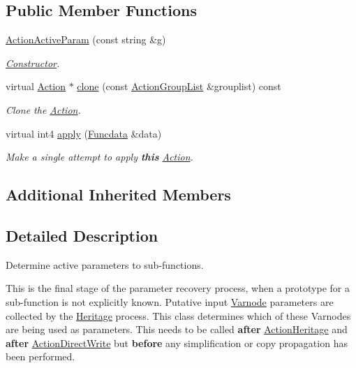 \subsection*{Public Member Functions}
\begin{DoxyCompactItemize}
\item 
\mbox{\hyperlink{class_action_active_param_a2048afd3f4b5377f11d9418d36fdb2f6}{Action\+Active\+Param}} (const string \&g)
\begin{DoxyCompactList}\small\item\em \mbox{\hyperlink{class_constructor}{Constructor}}. \end{DoxyCompactList}\item 
virtual \mbox{\hyperlink{class_action}{Action}} $\ast$ \mbox{\hyperlink{class_action_active_param_ae7135b6adc5448d7d03d4280bc12d610}{clone}} (const \mbox{\hyperlink{class_action_group_list}{Action\+Group\+List}} \&grouplist) const
\begin{DoxyCompactList}\small\item\em Clone the \mbox{\hyperlink{class_action}{Action}}. \end{DoxyCompactList}\item 
virtual int4 \mbox{\hyperlink{class_action_active_param_ab4bc14613f94c7114c1890d436c4d729}{apply}} (\mbox{\hyperlink{class_funcdata}{Funcdata}} \&data)
\begin{DoxyCompactList}\small\item\em Make a single attempt to apply {\bfseries{this}} \mbox{\hyperlink{class_action}{Action}}. \end{DoxyCompactList}\end{DoxyCompactItemize}
\subsection*{Additional Inherited Members}


\subsection{Detailed Description}
Determine active parameters to sub-\/functions. 

This is the final stage of the parameter recovery process, when a prototype for a sub-\/function is not explicitly known. Putative input \mbox{\hyperlink{class_varnode}{Varnode}} parameters are collected by the \mbox{\hyperlink{class_heritage}{Heritage}} process. This class determines which of these Varnodes are being used as parameters. This needs to be called {\bfseries{after}} \mbox{\hyperlink{class_action_heritage}{Action\+Heritage}} and {\bfseries{after}} \mbox{\hyperlink{class_action_direct_write}{Action\+Direct\+Write}} but {\bfseries{before}} any simplification or copy propagation has been performed. 

